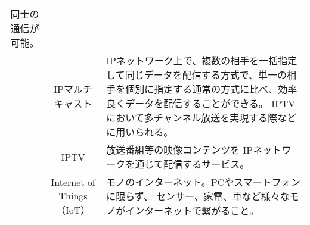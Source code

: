 \begin{table}[htb]
\begin{center}
\begin{tabular}{|c|c|p{10cm}|}
      同士の通信が可能。 \\
      \cline{2-3}
      & IPマルチキャスト & 
      IPネットワーク上で、複数の相手を一括指定して同じデータを配信する方式で、単一の相
      手を個別に指定する通常の方式に比べ、効率良くデータを配信することができる。 IPTV
      において多チャンネル放送を実現する際などに用いられる。 \\
      \cline{2-3}
      & IPTV & 放送番組等の映像コンテンツを IPネットワークを通じて配信するサービス。
      \\
      \cline{2-3}
      & Internet of Things（IoT）& モノのインターネット。PCやスマートフォンに限らず、
      センサー、家電、車など様々なモノがインターネットで繋がること。 \\
      \hline
    \end{tabular}
  \end{center}
\end{table}


